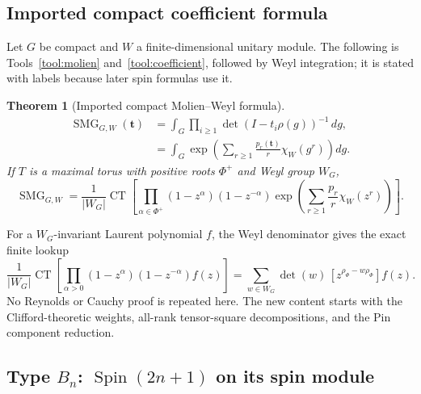 \documentclass[10pt]{article}
\newcommand{\CT}{\operatorname{CT}}
\newcommand{\SMG}{\operatorname{SMG}}
\newcommand{\MGF}{\SMG}
\newtheorem{theorem}{Theorem}
\begin{document}
\subsection{Imported compact coefficient formula}
Let $G$ be compact and $W$ a finite-dimensional unitary module. The following
is Tools~\ref{tool:molien} and~\ref{tool:coefficient}, followed by Weyl
integration; it is stated with labels because later spin formulas use it.
\begin{theorem}[Imported compact Molien--Weyl formula]
\label{nd:spin_pin:thm:molien}
\begin{align}
\MGF_{G,W}(\mathbf t)
&=\int_G\prod_{i\ge1}\det(I-t_i\rho(g))^{-1}\,dg,
\label{nd:spin_pin:eq:det-molien}\\
&=\int_G\exp\!\left(\sum_{r\ge1}\frac{p_r(\mathbf t)}r
\chi_W(g^r)\right)dg.\label{nd:spin_pin:eq:power-molien}
\end{align}
If $T$ is a maximal torus with positive roots $\Phi^+$ and Weyl group $W_G$,
\begin{equation}\label{nd:spin_pin:eq:weyl-master}
\boxed{\MGF_{G,W}=\frac1{|W_G|}\CT\!\left[
\prod_{\alpha\in\Phi^+}(1-z^\alpha)(1-z^{-\alpha})
\exp\!\left(\sum_{r\ge1}\frac{p_r}{r}\chi_W(z^r)\right)\right].}
\end{equation}
\end{theorem}
For a $W_G$-invariant Laurent polynomial $f$, the Weyl denominator gives the
exact finite lookup
\begin{equation}\label{nd:spin_pin:eq:alternant-lookup}
\frac1{|W_G|}\CT\!\left[
\prod_{\alpha>0}(1-z^\alpha)(1-z^{-\alpha})f(z)\right]
=\sum_{w\in W_G}\det(w)\,[z^{\rho_\Phi-w\rho_\Phi}]f(z).
\end{equation}
No Reynolds or Cauchy proof is repeated here. The new content starts with the
Clifford-theoretic weights, all-rank tensor-square decompositions, and the Pin
component reduction.

\subsection{\texorpdfstring{Type $B_n$: $\operatorname{Spin}(2n+1)$ on its spin module}%
{Type Bn: Spin(2n+1) on its spin module}}
\end{document}
